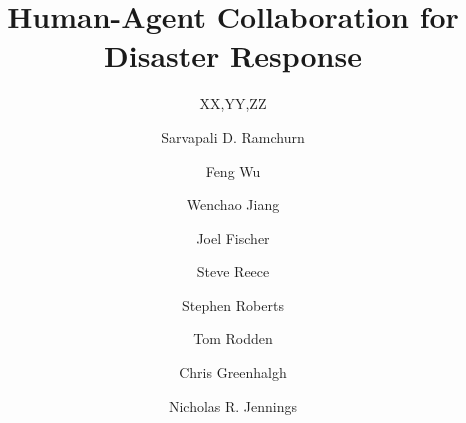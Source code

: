 \documentclass{svjour3}                     %
\begin{document}


\title{Human-Agent Collaboration for Disaster Response}




%
%
%
%

%

%
\author{XX,YY,ZZ}
\author{Sarvapali D. Ramchurn \and Feng Wu \and Wenchao Jiang \and Joel Fischer \and Steve Reece \and Stephen Roberts \and Tom Rodden \and Chris Greenhalgh \and  Nicholas R. Jennings 
}

%
\end{document}
